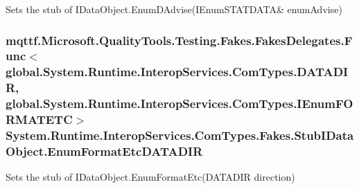 Sets the stub of I\-Data\-Object.\-Enum\-D\-Advise(I\-Enum\-S\-T\-A\-T\-D\-A\-T\-A\& enum\-Advise)

\hypertarget{class_system_1_1_runtime_1_1_interop_services_1_1_com_types_1_1_fakes_1_1_stub_i_data_object_a031093c158048e5e083d5f251557dea5}{
\subsubsection[{Enum\-Format\-Etc\-D\-A\-T\-A\-D\-I\-R}]{\setlength{\rightskip}{0pt plus 5cm}mqttf.\-Microsoft.\-Quality\-Tools.\-Testing.\-Fakes.\-Fakes\-Delegates.\-Func$<$global.\-System.\-Runtime.\-Interop\-Services.\-Com\-Types.\-D\-A\-T\-A\-D\-I\-R, global.\-System.\-Runtime.\-Interop\-Services.\-Com\-Types.\-I\-Enum\-F\-O\-R\-M\-A\-T\-E\-T\-C$>$ System.\-Runtime.\-Interop\-Services.\-Com\-Types.\-Fakes.\-Stub\-I\-Data\-Object.\-Enum\-Format\-Etc\-D\-A\-T\-A\-D\-I\-R}}\label{class_system_1_1_runtime_1_1_interop_services_1_1_com_types_1_1_fakes_1_1_stub_i_data_object_a031093c158048e5e083d5f251557dea5}


Sets the stub of I\-Data\-Object.\-Enum\-Format\-Etc(\-D\-A\-T\-A\-D\-I\-R direction)

